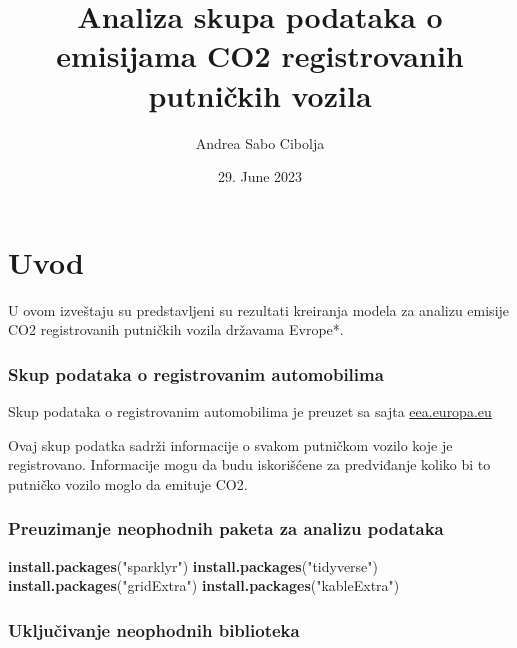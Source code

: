 \documentclass[]{article}
\title{Analiza skupa podataka o emisijama CO2 registrovanih putničkih vozila}
\author{Andrea Sabo Cibolja}
\date{29. June 2023}
\newenvironment{Shaded}{\begin{snugshade}}{\end{snugshade}}
\newcommand{\KeywordTok}[1]{\textcolor[rgb]{0.13,0.29,0.53}{\textbf{#1}}}
\newcommand{\NormalTok}[1]{#1}
\newcommand{\StringTok}[1]{\textcolor[rgb]{0.31,0.60,0.02}{#1}}
\begin{document}
\maketitle

\hypertarget{uvod}{%
\section{Uvod}\label{uvod}}

U ovom izveštaju su predstavljeni su rezultati kreiranja modela za
analizu emisije CO2 registrovanih putničkih vozila državama Evrope*.

\hypertarget{skup-podataka-o-registrovanim-automobilima}{%
\subsubsection{Skup podataka o registrovanim
automobilima}\label{skup-podataka-o-registrovanim-automobilima}}

Skup podataka o registrovanim automobilima je preuzet sa sajta
\href{https://www.eea.europa.eu/data-and-maps/data/co2-cars-emission-20}{eea.europa.eu}

Ovaj skup podatka sadrži informacije o svakom putničkom vozilo koje je
registrovano. Informacije mogu da budu iskorišćene za predviđanje koliko
bi to putničko vozilo moglo da emituje CO2.

\hypertarget{preuzimanje-neophodnih-paketa-za-analizu-podataka}{%
\subsubsection{Preuzimanje neophodnih paketa za analizu
podataka}\label{preuzimanje-neophodnih-paketa-za-analizu-podataka}}

\begin{Shaded}
\begin{Highlighting}[]
\KeywordTok{install.packages}\NormalTok{(}\StringTok{"sparklyr"}\NormalTok{)}
\KeywordTok{install.packages}\NormalTok{(}\StringTok{"tidyverse"}\NormalTok{)}
\KeywordTok{install.packages}\NormalTok{(}\StringTok{"gridExtra"}\NormalTok{)}
\KeywordTok{install.packages}\NormalTok{(}\StringTok{"kableExtra"}\NormalTok{)}
\end{Highlighting}
\end{Shaded}

\hypertarget{ukljuux10divanje-neophodnih-biblioteka}{%
\subsubsection{Uključivanje neophodnih
biblioteka}\label{ukljuux10divanje-neophodnih-biblioteka}}
\end{document}
